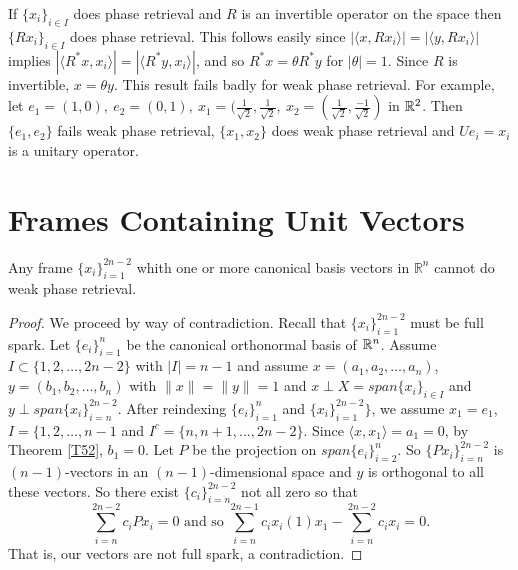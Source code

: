 If $\{x_i\}_{i\in I}$ does phase retrieval and $R$ is an invertible operator on the space then $\{Rx_i\}_{i\in I}$ does phase retrieval. 
This follows easily since $|\langle x,Rx_i\rangle|=|\langle y,Rx_i\rangle|$ implies $|\langle R^*x,x_i\rangle|=|\langle R^*y,x_i\rangle|$,
and so $R^*x=\theta R^*y$ for $|\theta|=1$. Since $R$ is invertible, $x=\theta y$.
This result fails badly for
weak phase retrieval. For example, let $e_1=(1,0),\ e_2=(0,1),\ x_1=(\frac{1}{\sqrt{2}},\frac{1}{\sqrt{2}},\ x_2=(\frac{1}{\sqrt{2}},\frac{-1}{\sqrt{2}})$ in $\mathbb R^2$.
Then $\{e_1,e_2\}$ fails weak phase retrieval, $\{x_1,x_2\}$ does weak phase retrieval and $Ue_i=x_i$ is a unitary operator.

\section{Frames Containing Unit Vectors}

\begin{theorem}\label{A1}
Any frame $\{x_i\}_{i=1}^{2n-2}$ whith one or more canonical basis vectors in $\mathbb{R}^n$ cannot do weak phase retrieval.
\end{theorem}

\begin{proof} We proceed by way of contradiction.
Recall that $\{x_i\}_{i=1}^{2n-2}$ must be full spark. Let $\{e_i\}_{i=1}^n$ be the canonical orthonormal basis
of $\mathbb R^n$. 
Assume $I\subset \{1,2,\ldots,2n-2\}$ with $|I|=n-1$ and assume
$x=(a_1,a_2,\ldots,a_n)$, $y=(b_1,b_2,\ldots ,b_n)$ with $\|x\|=\|y\|=1$ and $x\perp X=span\{x_i\}_{i\in I}$ and
$y\perp span\{x_i\}_{i=n}^{2n-2}$. 
After reindexing $\{e_i\}_{i=1}^n$ and $\{x_i\}_{i=1}^{2n-2}\}$, we assume $x_1=e_1$, $I=\{1,2,\ldots,n-1$ and
$I^c=\{n,n+1,\ldots,2n-2\}$. Since $\langle x,x_1\rangle = a_1=0$, by Theorem \ref{T52}, $b_1=0$.
 Let $P$ be the projection on $span\{e_i\}_{i=2}^{n}$. So $\{Px_i\}_{i=n}^{2n-2}$ is
$(n-1)$-vectors in an $(n-1)$-dimensional space and $y$ is orthogonal to all these vectors. So there exist
$\{c_i\}_{i=n}^{2n-2}$ not all zero so that 
\[ \sum_{i=n}^{2n-2}c_iPx_i=0\mbox{ and so }\sum_{i=n}^{2n-1}c_ix_i(1)x_1-\sum_{i=n}^{2n-2}c_ix_i=0.\]
That is, our vectors are not full spark, a contradiction.
\end{proof}


